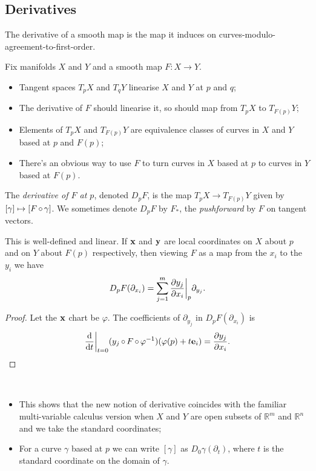 \documentclass[a4paper,11pt]{article}
\begin{document}
	\subsection{Derivatives} 

	The derivative of a smooth map is the map it induces on curves-modulo-agreement-to-first-order.

	Fix manifolds $X$ and $Y$ and a smooth map $F: X \to Y$.

	\begin{itemize}
		\item Tangent spaces $T_p X$ and $T_q Y$ linearise $X$ and $Y$ at $p$ and $q$;
		\item The derivative of $F$ should linearise it, so should map from $T_p X$ to $T_{F(p)}Y$;
		\item Elements of $T_p X$ and $T_{F(p)}Y$ are equivalence classes of curves in $X$ and $Y$ based at $p$ and $F(p)$;
		\item There's an obvious way to use $F$ to turn curves in $X$ based at $p$ to curves in $Y$ based at $F(p)$.
	\end{itemize}

	\begin{defi}
		The \emph{derivative of $F$ at $p$}, denoted $D_p F$, is the map $T_p X \to T_{F(p)}Y$ given by $[\gamma]\mapsto [F\operatorname{\circ} \gamma]$. We sometimes denote $D_p F$ by $F_*$, the \emph{pushforward} by $F$ on tangent vectors. 
	\end{defi}


	\begin{lem}
		This is well-defined and linear. If $\vb x$ and $\vb y$ are local coordinates on $X$ about $p$ and on $Y$ about $F(p)$ respectively, then viewing $F$ as a map from the $x_i$ to the $y_i$ we have
		\[
			D_p F(\partial_{x_i}) = \sum_{j=1}^m \pdv{y_j}{x_i}\bigg|_{p} \partial_{y_j}.
		\]
	\end{lem}
	\begin{proof}
		Let the $\vb x$ chart be $\varphi$. The coefficients of $\partial_{y_j}$ in $D_p F(\partial_{x_i})$ is
		\[
			\dv{t}\bigg|_{t=0} (y_j \operatorname{\circ} F \operatorname{\circ} \varphi^{-1}) (\varphi(p) + t \vb e_i) = \pdv{y_j}{x_i}.
		\]
	\end{proof}

	\begin{rmk}
		\
		\begin{itemize}
			\item This shows that the new notion of derivative coincides with the familiar multi-variable calculus version when $X$ and $Y$ are open subsets of $\mathbb{R}^m$ and $\mathbb{R}^n$ and we take the standard coordinates;
			\item For a curve $\gamma$ based at $p$ we can write $[\gamma]$ as $D_0 \gamma (\partial_t)$, where $t$ is the standard coordinate on the domain of $\gamma$.
		\end{itemize}
	\end{rmk}
\end{document}
